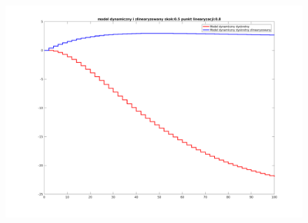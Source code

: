 \documentclass[a4paper, 11pt]{article}
\begin{document}
\begin{figure}[H]
\centering
\includegraphics[scale=0.45]{958.png}
\end{figure}
\end{document}
